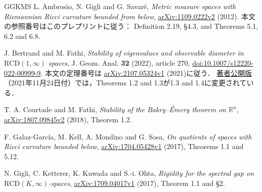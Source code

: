 \documentclass[12pt]{amsart}
\theoremstyle{definition}
\theoremstyle{remark}
\numberwithin{equation}{section}
\newcommand{\R}{\mathbb{R}}
\newcommand{\RCD}{\mathrm{RCD}}
\theoremstyle{jpplain}
\begin{document}
\begin{thebibliography}{GGKMS}
L. Ambrosio, N. Gigli and G. Savar\'e,
\emph{Metric measure spaces with Riemannian Ricci curvature bounded from below},
\href{https://arxiv.org/abs/1109.0222v2}{arXiv:1109.0222v2} (2012).
本文の参照番号はこのプレプリントに従う： Definition 2.19,
\S4.3, and Theorems 5.1, 6.2 and 6.8.

J. Bertrand and M. Fathi,
\emph{Stability of eigenvalues and observable diameter in
$\RCD(1,\infty)$ spaces},
J. Geom. Anal. \textbf{32} (2022), article 270,
\href{https://doi.org/10.1007/s12220-022-00999-9}{doi:10.1007/s12220-022-00999-9}.
本文の定理番号は
\href{https://arxiv.org/abs/2107.05324v1}{arXiv:2107.05324v1} (2021)に従う．
\href{https://www.math.univ-toulouse.fr/~bertrand/BertrandFathi.pdf}{著者公開版}（2021年11月24日付）では，Theorems 1.2 and 1.3が1.3 and 1.4に変更されている．

T. A. Courtade and M. Fathi,
\emph{Stability of the Bakry--\'Emery theorem on $\R^n$},
\href{https://arxiv.org/abs/1807.09845v2}{arXiv:1807.09845v2} (2018),
Theorem 1.2.

F. Galaz-Garc\'ia, M. Kell, A. Mondino and G. Sosa,
\emph{On quotients of spaces with Ricci curvature bounded below},
\href{https://arxiv.org/abs/1704.05428v1}{arXiv:1704.05428v1} (2017),
Theorems 1.1 and 5.12.

N. Gigli, C. Ketterer, K. Kuwada and S.-i. Ohta,
\emph{Rigidity for the spectral gap on $\RCD(K,\infty)$-spaces},
\href{https://arxiv.org/abs/1709.04017v1}{arXiv:1709.04017v1} (2017),
Theorem 1.1 and \S2.
\end{thebibliography}
\end{document}
